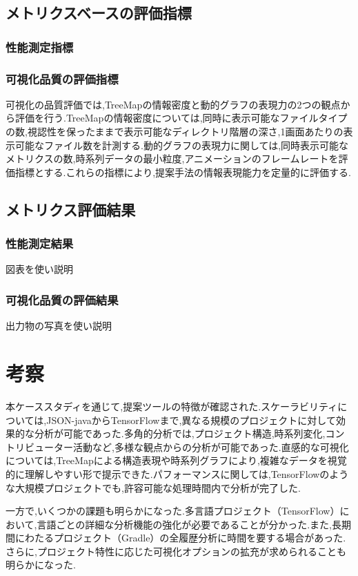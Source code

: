 \documentclass[12pt,twoside]{jbook}
\begin{document}
\section{メトリクスベースの評価指標}
\subsection{性能測定指標}
\subsection{可視化品質の評価指標}
可視化の品質評価では,TreeMapの情報密度と動的グラフの表現力の2つの観点から評価を行う.TreeMapの情報密度については,同時に表示可能なファイルタイプの数,視認性を保ったままで表示可能なディレクトリ階層の深さ,1画面あたりの表示可能なファイル数を計測する.動的グラフの表現力に関しては,同時表示可能なメトリクスの数,時系列データの最小粒度,アニメーションのフレームレートを評価指標とする.これらの指標により,提案手法の情報表現能力を定量的に評価する.

\section{メトリクス評価結果}
\subsection{性能測定結果}
図表を使い説明
\subsection{可視化品質の評価結果}
出力物の写真を使い説明

\chapter{考察}
本ケーススタディを通じて,提案ツールの特徴が確認された.スケーラビリティについては,JSON-javaからTensorFlowまで,異なる規模のプロジェクトに対して効果的な分析が可能であった.多角的分析では,プロジェクト構造,時系列変化,コントリビューター活動など,多様な観点からの分析が可能であった.直感的な可視化については,TreeMapによる構造表現や時系列グラフにより,複雑なデータを視覚的に理解しやすい形で提示できた.パフォーマンスに関しては,TensorFlowのような大規模プロジェクトでも,許容可能な処理時間内で分析が完了した.

一方で,いくつかの課題も明らかになった.多言語プロジェクト（TensorFlow）において,言語ごとの詳細な分析機能の強化が必要であることが分かった.また,長期間にわたるプロジェクト（Gradle）の全履歴分析に時間を要する場合があった.さらに,プロジェクト特性に応じた可視化オプションの拡充が求められることも明らかになった.
\end{document}

